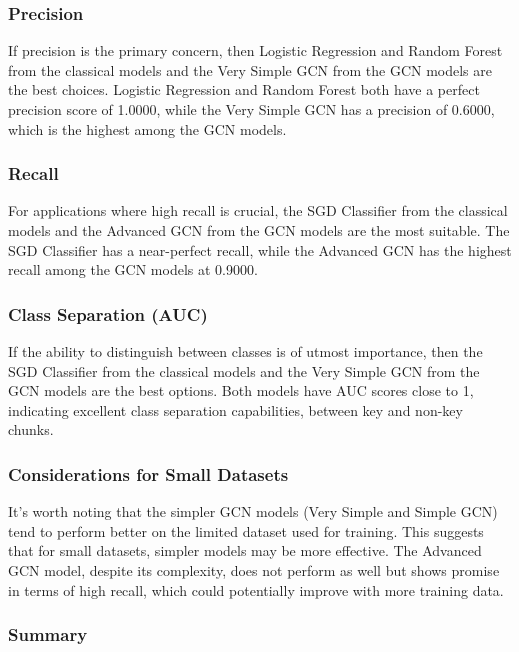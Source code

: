 \subsubsection{Precision}

If precision is the primary concern, then Logistic Regression and Random Forest from the classical models and the Very Simple GCN from the GCN models are the best choices. Logistic Regression and Random Forest both have a perfect precision score of 1.0000, while the Very Simple GCN has a precision of 0.6000, which is the highest among the GCN models.

\subsubsection{Recall}

For applications where high recall is crucial, the SGD Classifier from the classical models and the Advanced GCN from the GCN models are the most suitable. The SGD Classifier has a near-perfect recall, while the Advanced GCN has the highest recall among the GCN models at 0.9000.

\subsubsection{Class Separation (AUC)}

If the ability to distinguish between classes is of utmost importance, then the SGD Classifier from the classical models and the Very Simple GCN from the GCN models are the best options. Both models have AUC scores close to 1, indicating excellent class separation capabilities, between key and non-key chunks.

\subsubsection{Considerations for Small Datasets}

It's worth noting that the simpler GCN models (Very Simple and Simple GCN) tend to perform better on the limited dataset used for training. This suggests that for small datasets, simpler models may be more effective. The Advanced GCN model, despite its complexity, does not perform as well but shows promise in terms of high recall, which could potentially improve with more training data.

\subsubsection{Summary}

